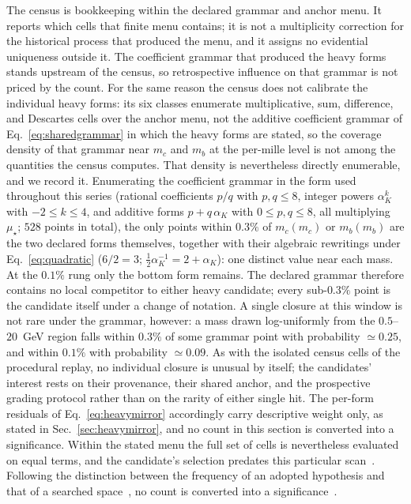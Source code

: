 \documentclass[aps,twocolumn,superscriptaddress,nofootinbib,floatfix]{revtex4-2}
\newcommand{\mstar}{\mu_\star}
\newcommand{\alphaK}{\alpha_K}
\begin{document}
The census is bookkeeping within the declared grammar and anchor menu. It reports which cells that finite menu contains; it is not a multiplicity correction for the historical process that produced the menu, and it assigns no evidential uniqueness outside it. The coefficient grammar that produced the heavy forms stands upstream of the census, so retrospective influence on that grammar is not priced by the count. For the same reason the census does not calibrate the individual heavy forms: its six classes enumerate multiplicative, sum, difference, and Descartes cells over the anchor menu, not the additive coefficient grammar of Eq.~\eqref{eq:sharedgrammar} in which the heavy forms are stated, so the coverage density of that grammar near $m_c$ and $m_b$ at the per-mille level is not among the quantities the census computes. That density is nevertheless directly enumerable, and we record it. Enumerating the coefficient grammar in the form used throughout this series (rational coefficients $p/q$ with $p,q\le8$, integer powers $\alphaK^k$ with $-2\le k\le4$, and additive forms $p+q\,\alphaK$ with $0\le p,q\le8$, all multiplying $\mstar$; $528$ points in total), the only points within $0.3\%$ of $m_c(m_c)$ or $m_b(m_b)$ are the two declared forms themselves, together with their algebraic rewritings under Eq.~\eqref{eq:quadratic} ($6/2=3$; $\tfrac12\alphaK^{-1}=2+\alphaK$): one distinct value near each mass. At the $0.1\%$ rung only the bottom form remains. The declared grammar therefore contains no local competitor to either heavy candidate; every sub-$0.3\%$ point is the candidate itself under a change of notation. A single closure at this window is not rare under the grammar, however: a mass drawn log-uniformly from the $0.5$--$20$~GeV region falls within $0.3\%$ of some grammar point with probability $\simeq0.25$, and within $0.1\%$ with probability $\simeq0.09$. As with the isolated census cells of the procedural replay, no individual closure is unusual by itself; the candidates' interest rests on their provenance, their shared anchor, and the prospective grading protocol rather than on the rarity of either single hit. The per-form residuals of Eq.~\eqref{eq:heavymirror} accordingly carry descriptive weight only, as stated in Sec.~\ref{sec:heavymirror}, and no count in this section is converted into a significance. Within the stated menu the full set of cells is nevertheless evaluated on equal terms, and the candidate's selection predates this particular scan~\cite{BrilliantGitHubEnum}. Following the distinction between the frequency of an adopted hypothesis and that of a searched space~\cite{Cousins2018,GrossVitells}, no count is converted into a significance~\cite{Lyons2013}.
\end{document}
